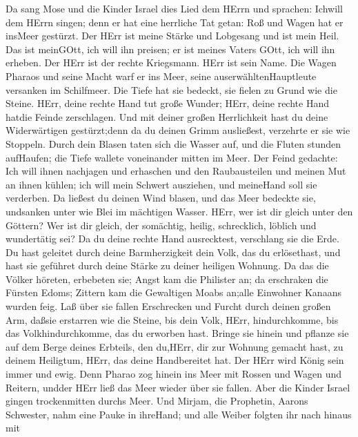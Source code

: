  Da sang Mose und die Kinder Israel dies Lied dem HErrn und
sprachen: Ichwill dem HErrn singen; denn er hat eine herrliche Tat
getan: Roß und Wagen hat er insMeer gestürzt.  Der HErr ist
meine Stärke und Lobgesang und ist mein Heil. Das ist meinGOtt, ich will
ihn preisen; er ist meines Vaters GOtt, ich will ihn erheben.
 Der HErr ist der rechte Kriegsmann. HErr ist sein Name.
 Die Wagen Pharaos und seine Macht warf er ins Meer, seine
auserwähltenHauptleute versanken im Schilfmeer.  Die Tiefe
hat sie bedeckt, sie fielen zu Grund wie die Steine.  HErr,
deine rechte Hand tut große Wunder; HErr, deine rechte Hand hatdie
Feinde zerschlagen.  Und mit deiner großen Herrlichkeit hast
du deine Widerwärtigen gestürzt;denn da du deinen Grimm ausließest,
verzehrte er sie wie Stoppeln.  Durch dein Blasen taten sich
die Wasser auf, und die Fluten stunden aufHaufen; die Tiefe wallete
voneinander mitten im Meer.  Der Feind gedachte: Ich will
ihnen nachjagen und erhaschen und den Raubausteilen und meinen Mut an
ihnen kühlen; ich will mein Schwert ausziehen, und meineHand soll sie
verderben.  Da ließest du deinen Wind blasen, und das Meer
bedeckte sie, undsanken unter wie Blei im mächtigen Wasser.
 HErr, wer ist dir gleich unter den Göttern? Wer ist dir
gleich, der somächtig, heilig, schrecklich, löblich und wundertätig sei?
 Da du deine rechte Hand ausrecktest, verschlang sie die
Erde.  Du hast geleitet durch deine Barmherzigkeit dein
Volk, das du erlösethast, und hast sie geführet durch deine Stärke zu
deiner heiligen Wohnung.  Da das die Völker höreten,
erbebeten sie; Angst kam die Philister an;  da erschraken
die Fürsten Edoms; Zittern kam die Gewaltigen Moabs an;alle Einwohner
Kanaans wurden feig.  Laß über sie fallen Erschrecken und
Furcht durch deinen großen Arm, daßsie erstarren wie die Steine, bis
dein Volk, HErr, hindurchkomme, bis das Volkhindurchkomme, das du
erworben hast.  Bringe sie hinein und pflanze sie auf dem
Berge deines Erbteils, den du,HErr, dir zur Wohnung gemacht hast, zu
deinem Heiligtum, HErr, das deine Handbereitet hat.  Der
HErr wird König sein immer und ewig.  Denn Pharao zog
hinein ins Meer mit Rossen und Wagen und Reitern, undder HErr ließ das
Meer wieder über sie fallen. Aber die Kinder Israel gingen trockenmitten
durchs Meer.  Und Mirjam, die Prophetin, Aarons Schwester,
nahm eine Pauke in ihreHand; und alle Weiber folgten ihr nach hinaus mit
